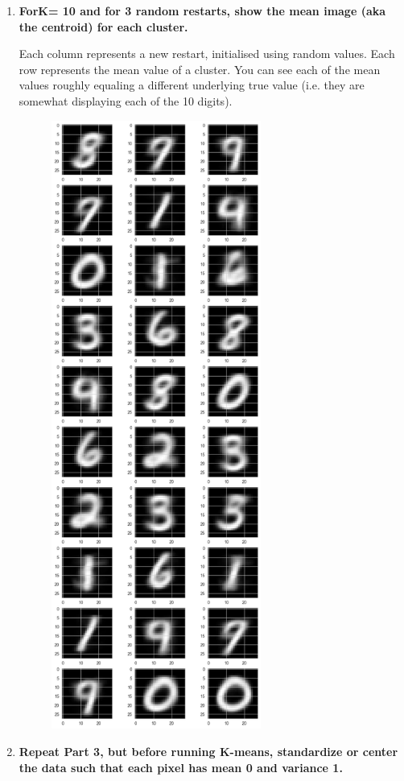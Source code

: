 \documentclass[submit]{harvardml}
\begin{document}
\begin{enumerate}
    \newpage
    \item \textbf{ ForK= 10 and for 3 random restarts, show the mean image (aka the centroid) for each cluster.}
    
    Each column represents a new restart, initialised using random values. Each row represents the mean value of a cluster. You can see each of the mean values roughly equaling a different underlying true value (i.e. they are somewhat displaying each of the 10 digits).
    
    \begin{figure}[H]
        \includegraphics[height=20cm]{hw4/img/p2_3.png}
        \centering
    \end{figure}
    
    \newpage
    \item \textbf{Repeat Part 3, but before running K-means, standardize or center the data such that each pixel has mean 0 and variance 1.}
    

\end{enumerate}
\end{document}
